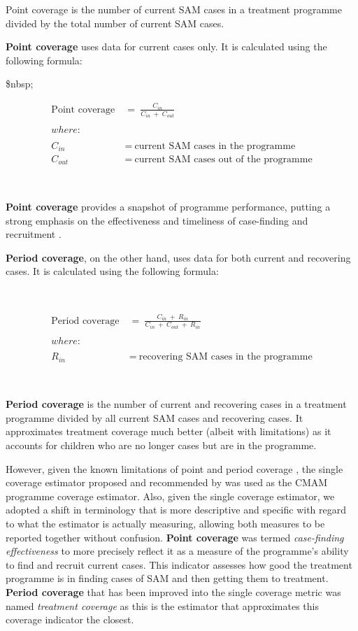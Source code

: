 \documentclass[12pt,a4paper]{article}
\theoremstyle{definition}
\theoremstyle{definition}
\theoremstyle{definition}
\theoremstyle{remark}
\begin{document}
Point coverage is the number of current SAM cases in a treatment
programme divided by the total number of current SAM cases.

\textbf{Point coverage} uses data for current cases only. It is
calculated using the following formula:

\$nbsp;

\[\begin{aligned} 
\text{Point coverage} & ~ = ~ \frac{C_{in}}{C_{in} ~ + ~ C_{out}} \\
\\
where: & \\
\\
C_{in} & ~ = ~ \text{current SAM cases in the programme} \\
C_{out} & ~ = ~ \text{current SAM cases out of the programme}
\end{aligned}\]

~

\textbf{Point coverage} provides a snapshot of programme performance,
putting a strong emphasis on the effectiveness and timeliness of
case-finding and recruitment \citep{Myatt:2012tt}.

\textbf{Period coverage}, on the other hand, uses data for both current
and recovering cases. It is calculated using the following formula:

~

\[\begin{aligned}
\text{Period coverage} & ~ = ~ \frac{C_{in} ~ + ~ R_{in}}{C_{in} ~ + ~ C_{out} ~ + ~ R_{in}} \\
\\
where: & \\
\\
R_{in} & ~ = ~ \text{recovering SAM cases in the programme}
\end{aligned}\]

~

\textbf{Period coverage} is the number of current and recovering cases
in a treatment programme divided by all current SAM cases and recovering
cases. It approximates treatment coverage much better (albeit with
limitations) as it accounts for children who are no longer cases but are
in the programme.

However, given the known limitations of point and period coverage
\citep{Myatt:2012tt}, the single coverage estimator proposed and
recommended by \citet{Balegamire:2015ud} was used as the CMAM programme
coverage estimator. Also, given the single coverage estimator, we
adopted a shift in terminology that is more descriptive and specific
with regard to what the estimator is actually measuring, allowing both
measures to be reported together without confusion. \textbf{Point
coverage} was termed \emph{case-finding effectiveness} to more precisely
reflect it as a measure of the programme's ability to find and recruit
current cases. This indicator assesses how good the treatment programme
is in finding cases of SAM and then getting them to treatment.
\textbf{Period coverage} that has been improved into the single coverage
metric was named \emph{treatment coverage} as this is the estimator that
approximates this coverage indicator the closest.
\end{document}
